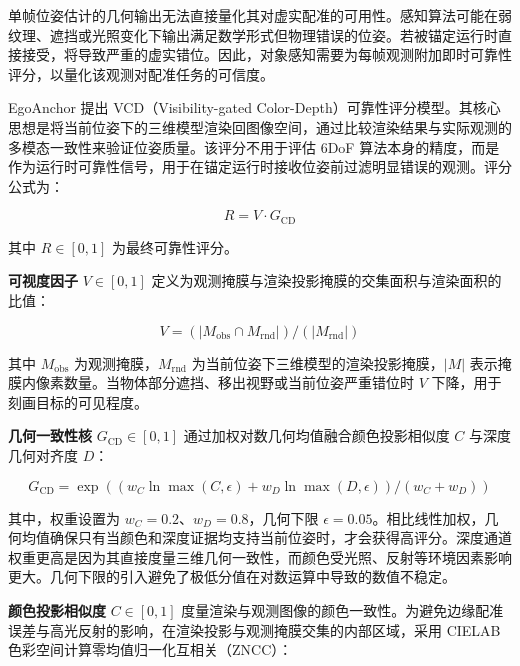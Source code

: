 \documentclass[review]{vgtc}
\begin{document}
单帧位姿估计的几何输出无法直接量化其对虚实配准的可用性。感知算法可能在弱纹理、遮挡或光照变化下输出满足数学形式但物理错误的位姿。若被锚定运行时直接接受，将导致严重的虚实错位。因此，对象感知需要为每帧观测附加即时可靠性评分，以量化该观测对配准任务的可信度。

EgoAnchor 提出 VCD（Visibility-gated Color-Depth）可靠性评分模型。其核心思想是将当前位姿下的三维模型渲染回图像空间，通过比较渲染结果与实际观测的多模态一致性来验证位姿质量。该评分不用于评估 6DoF 算法本身的精度，而是作为运行时可靠性信号，用于在锚定运行时接收位姿前过滤明显错误的观测。评分公式为：

\begin{equation}
R = V \cdot G_{\mathrm{CD}}
\label{eq:reliability}
\end{equation}


其中 $R \in [0,1]$ 为最终可靠性评分。

\textbf{可视度因子} $V \in [0,1]$ 定义为观测掩膜与渲染投影掩膜的交集面积与渲染面积的比值：

\begin{equation}
V = (\lvert M_{\mathrm{obs}} \cap M_{\mathrm{rnd}} \rvert) / (\lvert M_{\mathrm{rnd}} \rvert)
\label{eq:visibility}
\end{equation}


其中 $M_{\mathrm{obs}}$ 为观测掩膜，$M_{\mathrm{rnd}}$ 为当前位姿下三维模型的渲染投影掩膜，$\lvert M \rvert$ 表示掩膜内像素数量。当物体部分遮挡、移出视野或当前位姿严重错位时 $V$ 下降，用于刻画目标的可见程度。

\textbf{几何一致性核} $G_{\mathrm{CD}} \in [0,1]$ 通过加权对数几何均值融合颜色投影相似度 $C$ 与深度几何对齐度 $D$：

\begin{equation}
G_{\mathrm{CD}} = \exp\!\left((w_C \ln \max\!\left(C, \epsilon\right) + w_D \ln \max\!\left(D, \epsilon\right)) / (w_C + w_D)\right)
\label{eq:cd-consistency}
\end{equation}


其中，权重设置为 $w_C = 0.2$、$w_D = 0.8$，几何下限 $\epsilon = 0.05$。相比线性加权，几何均值确保只有当颜色和深度证据均支持当前位姿时，才会获得高评分。深度通道权重更高是因为其直接度量三维几何一致性，而颜色受光照、反射等环境因素影响更大。几何下限的引入避免了极低分值在对数运算中导致的数值不稳定。

\textbf{颜色投影相似度} $C \in [0,1]$ 度量渲染与观测图像的颜色一致性。为避免边缘配准误差与高光反射的影响，在渲染投影与观测掩膜交集的内部区域，采用 CIELAB 色彩空间计算零均值归一化互相关（ZNCC）：
\end{document}
